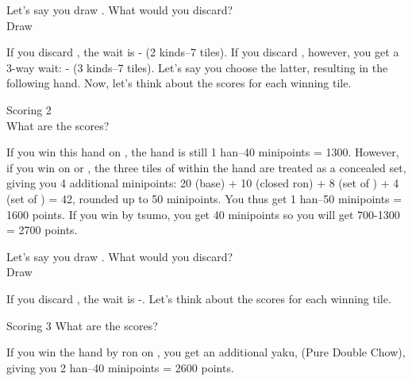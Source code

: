 \bigskip

Let's say you draw {\LARGE{}}. What would you discard?
\newpage
\bp
{}\zhong\zhong\zhong~\\
\hfill\footnotesize{Draw~~~~~~~~~~~~~~~}
\ep

If you discard {\LARGE{}}, the wait is {\LARGE{}-} (2 kinds--7 tiles). If you discard {\LARGE{}}, however, you get a 3-way wait: {\LARGE{}- } (3 kinds--7 tiles). Let's say you choose the latter, resulting in the following hand. Now, let's think about the scores for each winning tile. 

\bigskip
\begin{itembox}[r]{Scoring 2}
\bp
{}\zhong\zhong\zhong\\
\ep
\vspace{-5pt} What are the scores?
\end{itembox}

\bigskip
If you win this hand on {\LARGE{}}, the hand is still 1 {\jap han}--40 minipoints = 1300. However, if you win on {\LARGE{}} or {\LARGE{}}, the three tiles of {\LARGE{}} within the hand are treated as a concealed set, giving you 4 additional minipoints: 20 (base) + 10 (closed {\jap ron}) + 8 (set of \zhong) + 4 (set of ) = 42, rounded up to 50 minipoints. You thus get 1 {\jap han}--50 minipoints = 1600 points. If you win by {\jap tsumo}, you get 40 minipoints so you will get 700-1300 = 2700 points. 

\bigskip

Let's say you draw {\LARGE{}}. What would you discard? 
\bp
{}\zhong\zhong\zhong~\\
\hfill\footnotesize{Draw~~~~~~~~~~~~~~~}
\ep

If you discard {\LARGE{}}, the wait is {\LARGE{}-}. Let's think about the scores for each winning tile. 
\newpage
\begin{itembox}[r]{Scoring 3}
\bp
{}\zhong\zhong\zhong
\ep
\vspace{-5pt} What are the scores?
\end{itembox}

\bigskip
If you win the hand by {\jap ron} on {\LARGE{}}, you get an additional {\jap yaku},  (Pure Double Chow), giving you 2 {\jap han}--40 minipoints = 2600 points. 


